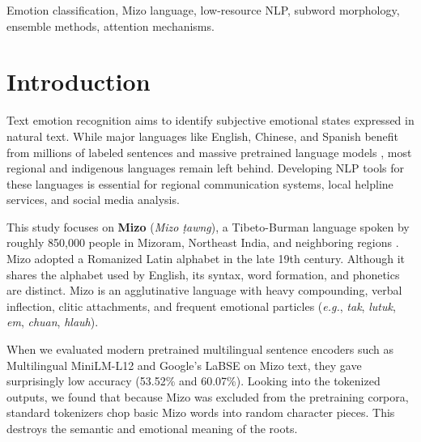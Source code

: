 \documentclass[conference]{IEEEtran}
\begin{document}
\begin{IEEEkeywords}
Emotion classification, Mizo language, low-resource NLP, subword morphology, ensemble methods, attention mechanisms.
\end{IEEEkeywords}

\section{Introduction}
Text emotion recognition aims to identify subjective emotional states expressed in natural text. While major languages like English, Chinese, and Spanish benefit from millions of labeled sentences and massive pretrained language models \cite{devlin2019bert, liu2019roberta}, most regional and indigenous languages remain left behind. Developing NLP tools for these languages is essential for regional communication systems, local helpline services, and social media analysis.

This study focuses on \textbf{Mizo} (\textit{Mizo \d{t}awng}), a Tibeto-Burman language spoken by roughly 850,000 people in Mizoram, Northeast India, and neighboring regions \cite{chhangte1993phonological}. Mizo adopted a Romanized Latin alphabet in the late 19th century. Although it shares the alphabet used by English, its syntax, word formation, and phonetics are distinct. Mizo is an agglutinative language with heavy compounding, verbal inflection, clitic attachments, and frequent emotional particles (\textit{e.g.}, \textit{tak}, \textit{lutuk}, \textit{em}, \textit{chuan}, \textit{hlauh}).

When we evaluated modern pretrained multilingual sentence encoders such as Multilingual MiniLM-L12 \cite{reimers2019sentence} and Google's LaBSE \cite{feng2022language} on Mizo text, they gave surprisingly low accuracy (53.52\% and 60.07\%). Looking into the tokenized outputs, we found that because Mizo was excluded from the pretraining corpora, standard tokenizers chop basic Mizo words into random character pieces. This destroys the semantic and emotional meaning of the roots.
\end{document}

